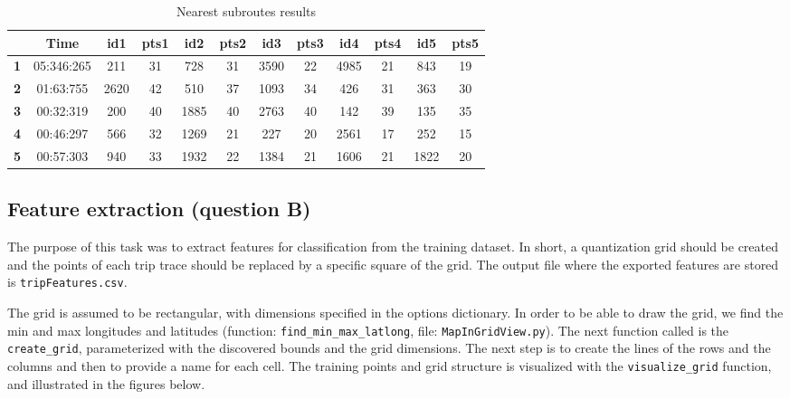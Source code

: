 \documentclass[12pt]{article}
\begin{document}
	\begin{table}[H]
		\centering
		\begin{tabular}{|c|c|c|c|c|c|c|c|c|c|c|c|}
			\hline
			\textbf{}  & \textbf{Time} & \textbf{id1} & \textbf{pts1} & \textbf{id2} & \textbf{pts2} & \textbf{id3} & \textbf{pts3} & \textbf{id4} & \textbf{pts4} & \textbf{id5} & \textbf{pts5} \\ \hline
			\textbf{1} & 05:346:265     & 211          & 31            & 728          & 31            & 3590         & 22            & 4985          & 21            & 843          & 19            \\ \hline
			\textbf{2} & 01:63:755     & 2620         & 42            & 510          & 37            & 1093         & 34            & 426          & 31            & 363          & 30            \\ \hline
			\textbf{3} & 00:32:319     & 200          & 40            & 1885         & 40            & 2763         & 40            & 142          & 39            & 135          & 35            \\ \hline
			\textbf{4} & 00:46:297     & 566          & 32            & 1269         & 21            & 227          & 20            & 2561         & 17            & 252          & 15            \\ \hline
			\textbf{5} & 00:57:303     & 940          & 33            & 1932         & 22            & 1384         & 21            & 1606         & 21            & 1822         & 20            \\ \hline
		\end{tabular}
	\caption{Nearest subroutes results}
	\label{subres}
	\end{table}
	
	\subsection{Feature extraction (question B)}
	The purpose of this task was to extract features for classification from the
  training dataset. In short, a quantization grid should be created and the points of each trip trace should be replaced by a specific square of the grid. The output file where the exported features are stored is \texttt{tripFeatures.csv}.
	
The grid is assumed to be rectangular, with dimensions specified in the options
dictionary. In order to be able to draw the grid, we find the min and max
longitudes and latitudes (function: \texttt{find\_min\_max\_latlong}, file:
\texttt{MapInGridView.py}). The next function called is the
\texttt{create\_grid}, parameterized with the discovered bounds and the grid
dimensions. The next step is to create the lines of the rows and the columns and
then to provide a name for each cell. The training points and grid structure is
visualized with the \texttt{visualize\_grid} function, and illustrated in the
figures below.
	
\end{document}
